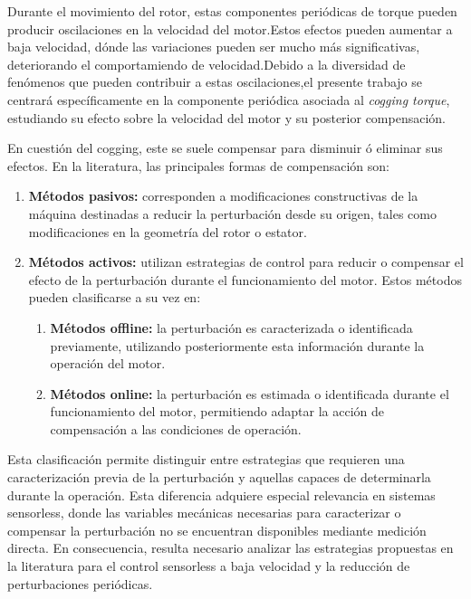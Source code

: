 Durante el movimiento del rotor, estas componentes periódicas de torque pueden producir oscilaciones en la velocidad del motor.Estos efectos pueden aumentar a baja velocidad, dónde las variaciones pueden ser mucho más significativas, deteriorando el comportamiendo de velocidad.Debido a la diversidad de fenómenos que pueden contribuir a estas oscilaciones,el presente trabajo se centrará específicamente en la componente
periódica asociada al \textit{cogging torque}, estudiando su efecto
sobre la velocidad del motor y su posterior compensación.

En cuestión del cogging, este se suele compensar para disminuir ó eliminar sus efectos. En la literatura, las principales formas de compensación son:


\begin{enumerate}
    \item \textbf{Métodos pasivos:} corresponden a modificaciones
    constructivas de la máquina destinadas a reducir la perturbación
    desde su origen, tales como modificaciones en la geometría del
    rotor o estator.

    \item \textbf{Métodos activos:} utilizan estrategias de control
    para reducir o compensar el efecto de la perturbación durante
    el funcionamiento del motor. Estos métodos pueden clasificarse
    a su vez en:

    \begin{enumerate}
        \item \textbf{Métodos offline:} la perturbación es caracterizada
        o identificada previamente, utilizando posteriormente esta
        información durante la operación del motor.

        \item \textbf{Métodos online:} la perturbación es estimada o
        identificada durante el funcionamiento del motor, permitiendo
        adaptar la acción de compensación a las condiciones de operación.
    \end{enumerate}
\end{enumerate}



Esta clasificación permite distinguir entre estrategias que requieren una caracterización previa de la perturbación y aquellas capaces de determinarla durante la operación. Esta diferencia adquiere especial relevancia en sistemas sensorless, donde las variables mecánicas necesarias para caracterizar o compensar la perturbación no se encuentran disponibles mediante medición directa. En consecuencia, resulta necesario analizar las estrategias propuestas en la literatura para el control sensorless a baja velocidad y la reducción de perturbaciones periódicas.



